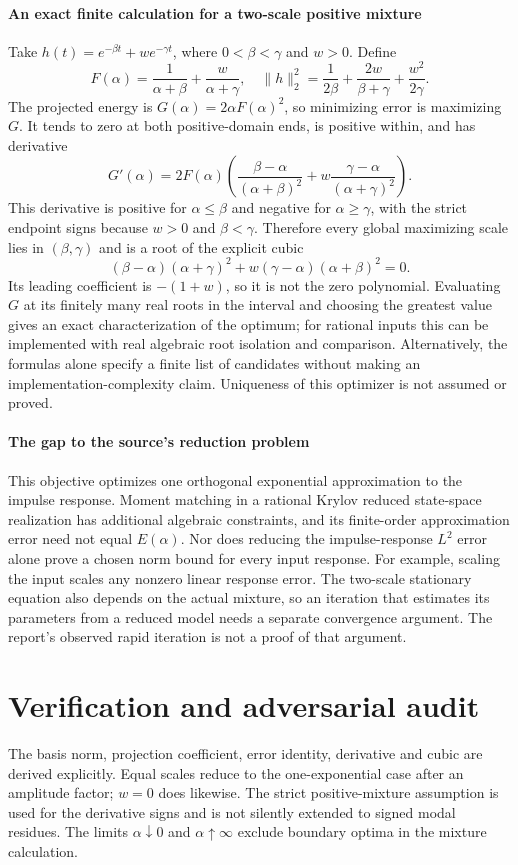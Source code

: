\documentclass[11pt]{article}
\begin{document}
\paragraph{An exact finite calculation for a two-scale positive mixture}
Take $h(t)=e^{-\beta t}+w e^{-\gamma t}$, where $0<\beta<\gamma$ and $w>0$. Define
\[
 F(\alpha)=\frac1{\alpha+\beta}+\frac{w}{\alpha+\gamma},\quad
 \lVert h\rVert_2^2=\frac1{2\beta}+\frac{2w}{\beta+\gamma}+\frac{w^2}{2\gamma}.
\]
The projected energy is $G(\alpha)=2\alpha F(\alpha)^2$, so minimizing error is maximizing $G$. It tends to zero at both positive-domain ends, is positive within, and has derivative
\[
 G'(\alpha)=2F(\alpha)\left(
 \frac{\beta-\alpha}{(\alpha+\beta)^2}
 +w\frac{\gamma-\alpha}{(\alpha+\gamma)^2}\right).
\]
This derivative is positive for $\alpha\leq\beta$ and negative for $\alpha\geq\gamma$, with the strict endpoint signs because $w>0$ and $\beta<\gamma$. Therefore every global maximizing scale lies in $(\beta,\gamma)$ and is a root of the explicit cubic
\[
 (\beta-\alpha)(\alpha+\gamma)^2
 +w(\gamma-\alpha)(\alpha+\beta)^2=0.
\]
Its leading coefficient is $-(1+w)$, so it is not the zero polynomial. Evaluating $G$ at its finitely many real roots in the interval and choosing the greatest value gives an exact characterization of the optimum; for rational inputs this can be implemented with real algebraic root isolation and comparison. Alternatively, the formulas alone specify a finite list of candidates without making an implementation-complexity claim. Uniqueness of this optimizer is not assumed or proved.

\paragraph{The gap to the source's reduction problem}
This objective optimizes one orthogonal exponential approximation to the impulse response. Moment matching in a rational Krylov reduced state-space realization has additional algebraic constraints, and its finite-order approximation error need not equal $E(\alpha)$. Nor does reducing the impulse-response $L^2$ error alone prove a chosen norm bound for every input response. For example, scaling the input scales any nonzero linear response error. The two-scale stationary equation also depends on the actual mixture, so an iteration that estimates its parameters from a reduced model needs a separate convergence argument. The report's observed rapid iteration is not a proof of that argument.

\section{Verification and adversarial audit}
The basis norm, projection coefficient, error identity, derivative and cubic are derived explicitly. Equal scales reduce to the one-exponential case after an amplitude factor; $w=0$ does likewise. The strict positive-mixture assumption is used for the derivative signs and is not silently extended to signed modal residues. The limits $\alpha\downarrow0$ and $\alpha\uparrow\infty$ exclude boundary optima in the mixture calculation.
\end{document}

